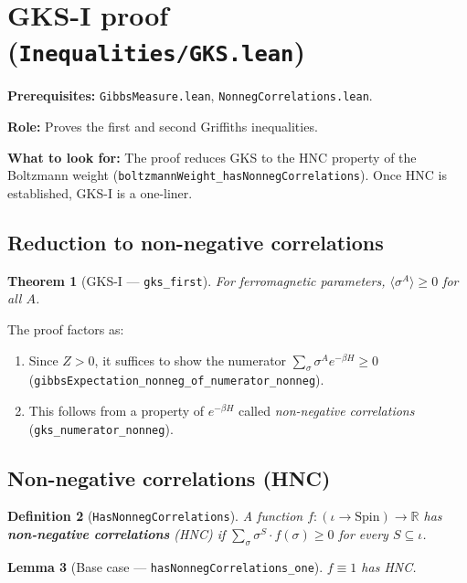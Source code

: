 \documentclass[a4paper,11pt]{article}
\newtheorem{theorem}{Theorem}
\newtheorem{lemma}[theorem]{Lemma}
\newtheorem{definition}[theorem]{Definition}
\begin{document}
\section{GKS-I proof (\texttt{Inequalities/GKS.lean})}

\par\noindent\textbf{Prerequisites:} \texttt{GibbsMeasure.lean},
\texttt{NonnegCorrelations.lean}.

\textbf{Role:} Proves the first and second Griffiths inequalities.

\textbf{What to look for:} The proof reduces GKS to the HNC property
of the Boltzmann weight (\texttt{boltzmannWeight\_hasNonnegCorrelations}).
Once HNC is established, GKS-I is a one-liner.

\subsection{Reduction to non-negative correlations}

\begin{theorem}[GKS-I --- \texttt{gks\_first}]
For ferromagnetic parameters, $\langle \sigma^A \rangle \geq 0$
for all $A$.
\end{theorem}

The proof factors as:
\begin{enumerate}
  \item Since $Z > 0$, it suffices to show the numerator
    $\sum_\sigma \sigma^A e^{-\beta H} \geq 0$
    (\texttt{gibbsExpectation\_nonneg\_of\_numerator\_nonneg}).
  \item This follows from a property of $e^{-\beta H}$ called
    \emph{non-negative correlations}
    (\texttt{gks\_numerator\_nonneg}).
\end{enumerate}

\subsection{Non-negative correlations (HNC)}

\begin{definition}[\texttt{HasNonnegCorrelations}]
A function $f : (\iota \to \mathrm{Spin}) \to \mathbb{R}$ has
\textbf{non-negative correlations} (HNC) if
$\sum_\sigma \sigma^S \cdot f(\sigma) \geq 0$ for every
$S \subseteq \iota$.
\end{definition}

\begin{lemma}[Base case --- \texttt{hasNonnegCorrelations\_one}]
$f \equiv 1$ has HNC.
\end{lemma}
\end{document}
